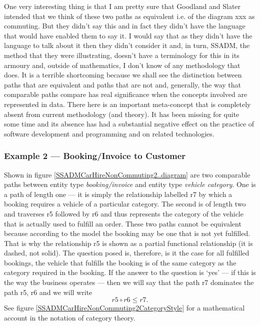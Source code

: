 \begin{oldtt}
\mynote One very interesting thing is that I am pretty sure that Goodland and Slater intended that we think of these two paths as equivalent i.e. of the diagram xxx as commuting. But they didn't say this and in fact they didn't have the language that would have enabled them to say it. I would say that as they didn't have the language to talk about it then they didn't consider it and, in turn, SSADM, the method that they were illustrating, doesn't  have a terminology for this in its armoury  and,
outside of mathematics, I don't know of any methodology that does. 
It is a terrible shortcoming  because  we shall see the distinction between paths that are equivalent and paths that are not and, generally, the way that comparable paths compare has real significance when the concepts involved are represented in data. 
There here is an important meta-concept that is completely absent from current methodology
(and theory). It has been missing for quite some time and its absence has had a substantial negative effect on the practice of software development and programming and on related technologies.  
\end{oldtt}
\subsubsection{Example 2 --- Booking/Invoice to Customer}
\mynote
Shown in figure \ref{SSADMCarHireNonCommuting2..diagram} are two comparable paths between entity type \textit{booking/invoice} and
entity type \textit{vehicle category}. One is a path of length one --- it is simply the relationship labelled r7 by which a booking requires a vehicle of a particular category.
The second is of length two and traverses r5 followed by r6 and thus represents the category of the vehicle that is actually used to fulfill an order. These two paths cannot be equivalent because according to the model the booking may be one that is not yet fulfilled. That is why the relationship r5 is shown as a partial functional relationship (it is dashed, not solid). The question posed is, therefore, is it the case for all fulfilled bookings, the vehicle that fulfills the booking is of the same category as the category required in the booking. If the answer to the question is `yes' --- if this is the way the business operates --- then we will say that the path r7 dominates the path r5, r6 and we will write 
\begin{equation*}
r5 \circ r6 \leq r7.
\end{equation*} 
See figure \ref{SSADMCarHireNonCommuting2CategoryStyle} for a mathematical account in the notation of category theory.

